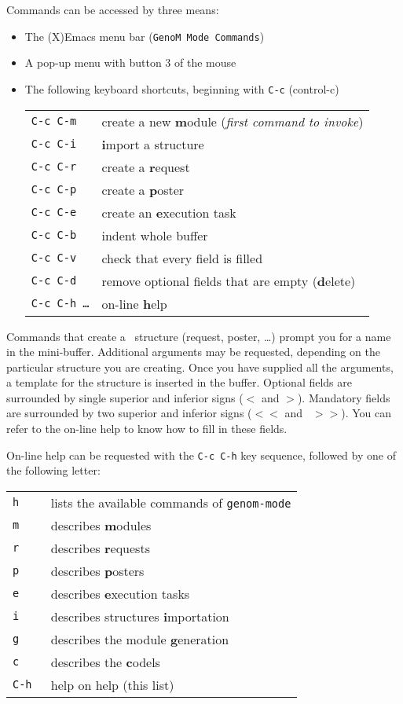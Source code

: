 Commands can be accessed by three means:
\begin{itemize}
\item The (X)Emacs menu bar ({\tt GenoM Mode Commands})
\item A pop-up menu with button 3 of the mouse
\item The following keyboard shortcuts, beginning with {\tt C-c} (control-c)

{\small
\begin{tabular}{|l|p{10cm}|}
\hline
\tt C-c C-m & create a new {\bf m}odule  ({\em first command to invoke})\\
\tt C-c C-i & {\bf i}mport a structure \\
\tt C-c C-r & create a {\bf r}equest \\
\tt C-c C-p & create a {\bf p}oster \\
\tt C-c C-e & create an {\bf e}xecution task\\
\hline
\tt C-c C-b & indent whole buffer \\
\tt C-c C-v & check that every field is filled \\
\tt C-c C-d & remove optional fields that are empty ({\bf d}elete) \\
\hline
\tt C-c C-h \ldots & on-line {\bf h}elp\\
\hline
\end{tabular}}
\end{itemize}

Commands that create a \GenoM\ structure (request, poster, \ldots) prompt
you  for  a   name in  the   mini-buffer.  Additional   arguments may  be
requested, depending on the particular structure you  are creating.  Once
you  have  supplied all the  arguments,  a template  for the structure is
inserted  in the buffer.   Optional   fields  are surrounded  by   single
superior and inferior signs ({\tt  $<$} and {\tt $>$}). Mandatory  fields
are surrounded by two  superior and inferior signs  ({\tt $<<$}  and {\tt
$>>$}). You  can refer to the  on-line help to know  how to fill in these
fields.

On-line help can be requested with the {\tt C-c C-h} key sequence,
followed by one of the following letter:

{\small
\begin{tabular}{|l|p{10cm}|}
\hline
\tt h & lists the available commands of {\tt genom-mode}  \\
\tt m & describes {\bf m}odules \\
\tt r & describes {\bf r}equests \\
\tt p & describes {\bf p}osters \\
\tt e & describes {\bf e}xecution tasks \\
\tt i & describes structures {\bf i}mportation \\
\tt g & describes the module {\bf g}eneration  \\
\tt c & describes the {\bf c}odels  \\
\tt C-h & help on help (this list) \\
\hline
\end{tabular}}

